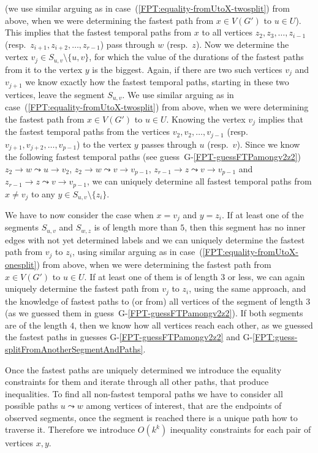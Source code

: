 \documentclass[a4paper,UKenglish,cleveref, autoref, thm-restate]{lipics-v2021}
\begin{document}
\begin{enumerate}[(i)]
(we use similar arguing as in case~(\ref{FPT:equality-fromUtoX-twosplit}) from above, when we were determining the fastest path from $x \in V(G')$ to $u \in U$).
This implies that the fastest temporal paths from $x$ to all vertices $z_2, z_3, \dots, z_{i-1}$ (resp.~$z_{i+1}, z_{i+2}, \dots, z_{r-1}$)  pass through $w$ (resp.~$z$).
Now we determine the vertex $v_j \in S_{u,v} \setminus \{u,v\}$,
for which the value of the durations of the fastest paths from it to the vertex $y$ is the biggest.
Again, if there are two such vertices $v_{j}$ and $v_{j+1}$ we know exactly how the fastest temporal paths, starting in these two vertices,
leave the segment $S_{u,v}$. 
We use similar arguing as in case~(\ref{FPT:equality-fromUtoX-twosplit}) from above, when we were determining the fastest path from $x \in V(G')$ to $u \in U$.
Knowing the vertex $v_j$
implies that the fastest temporal paths from the vertices $v_2, v_2, \dots, v_{j-1}$ (resp.~$v_{j+1}, v_{j+2}, \dots, v_{p-1}$) to the vertex $y$ passes through $u$ (resp.~$v$).
Since we know the following fastest temporal paths (see guess~G-\ref{FPT-guessFTPamongv2z2}) 
$z_2 \rightarrow w \leadsto u \rightarrow v_2$,
$z_2 \rightarrow w \leadsto v \rightarrow v_{p-1}$,
$z_{r-1} \rightarrow z \leadsto v \rightarrow v_{p-1}$ and
$z_{r-1} \rightarrow z \leadsto v \rightarrow v_{p-1}$,
we can uniquely determine all fastest temporal paths from $x \neq v_j$ to any $y \in S_{u,v} \setminus \{z_i\}$.

We have to now consider the case when 
$x = v_j$ and $y = z_i$.
If at least one of the segments $S_{u,v}$ and $S_{w,z}$ is of length more than $5$,
then this segment has no inner edges with not yet determined labels
and
we can uniquely determine the fastest path from $v_j$ to $z_i$,
using 
similar arguing as in case~(\ref{FPT:equality-fromUtoX-onesplit}) from above, when we were determining the fastest path from $x \in V(G')$ to $u \in U$.
If at least one of them is of length $3$ or less,
we can again uniquely determine the fastest path from $v_j$ to $z_i$, using the same approach, 
and the knowledge of fastest paths to (or from) all vertices of the segment of length $3$
(as we guessed them in guess~G-\ref{FPT-guessFTPamongv2z2}).
If both segments are of the length $4$, then we know how all vertices reach each other,
as we guessed the fastest paths in guesses G-\ref{FPT-guessFTPamongv2z2} and G-\ref{FPT:guess-splitFromAnotherSegmentAndPaths}.
\end{enumerate}
Once the fastest paths are uniquely determined we introduce the equality constraints for them
and iterate through all other paths, that produce inequalities.
To find all non-fastest temporal paths we have to consider all possible paths $u \leadsto w$ among vertices of interest, that are the endpoints of observed segments,
once the segment is reached there is a unique path how to traverse it.
Therefore we introduce $O(k^k)$ inequality constraints for each pair of vertices $x,y$.
\end{document}
